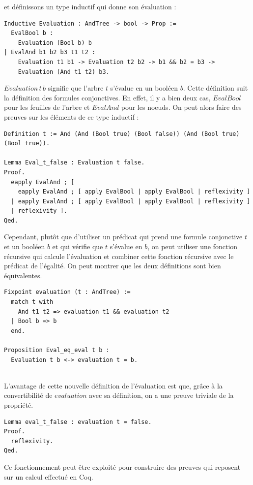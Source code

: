 \documentclass[11pt]{article}
\begin{document}
et définissons un type inductif qui donne son évaluation : 

\begin{lstlisting}[frame=single]
Inductive Evaluation : AndTree -> bool -> Prop :=
  EvalBool b :
    Evaluation (Bool b) b
| EvalAnd b1 b2 b3 t1 t2 :
    Evaluation t1 b1 -> Evaluation t2 b2 -> b1 && b2 = b3 ->
    Evaluation (And t1 t2) b3.
\end{lstlisting}
$Evaluation \, t \, b$ signifie que l'arbre $t$ s'évalue en un booléen $b$. Cette définition suit la définition des formules conjonctives. En effet, il y a bien deux cas, $EvalBool$ pour les feuilles de l'arbre et $EvalAnd$ pour les noeuds.  
On peut alors faire des preuves sur les éléments de ce type inductif : 
\begin{lstlisting}[frame=single]
Definition t := And (And (Bool true) (Bool false)) (And (Bool true) (Bool true)).

Lemma Eval_t_false : Evaluation t false.
Proof.
  eapply EvalAnd ; [
    eapply EvalAnd ; [ apply EvalBool | apply EvalBool | reflexivity ]
  | eapply EvalAnd ; [ apply EvalBool | apply EvalBool | reflexivity ]
  | reflexivity ].
Qed.
\end{lstlisting}

Cependant, plutôt que d'utiliser un prédicat qui prend une formule conjonctive $t$ et un booléen $b$ et qui vérifie que $t$ s'évalue en $b$, on peut utiliser une fonction récursive qui calcule l'évaluation et combiner cette fonction récursive avec le prédicat de l'égalité. On peut montrer que les deux définitions sont bien équivalentes.  
\begin{lstlisting}[frame=single]
Fixpoint evaluation (t : AndTree) :=
  match t with
    And t1 t2 => evaluation t1 && evaluation t2
  | Bool b => b
  end.
  
Proposition Eval_eq_eval t b :
  Evaluation t b <-> evaluation t = b.
  
\end{lstlisting}

L'avantage de cette nouvelle définition de l'évaluation est que, grâce à la convertibilité de $evaluation$ avec sa définition, on a une preuve triviale de la propriété.
\begin{lstlisting}[frame=single]
Lemma eval_t_false : evaluation t = false.
Proof.
  reflexivity.
Qed.
\end{lstlisting}

Ce fonctionnement peut être exploité pour construire des preuves qui reposent sur un calcul effectué en Coq. 
\end{document}
